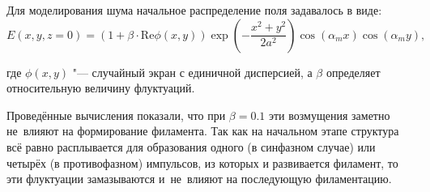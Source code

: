 Для моделирования шума начальное распределение поля задавалось в виде:
\begin{equation}
    E(x, y, z = 0) = (1 + \beta \cdot \mathrm{Re} \phi(x, y)) \exp \left( -\frac{x^2 + y^2}{2 a^2}\right) \cos(\alpha_m x) \cos(\alpha_m y),
\end{equation}

\noindent где $\phi(x, y)$ "--- случайный экран с единичной дисперсией, а $\beta$ определяет относительную величину флуктуаций.

Проведённые вычисления показали, что при $\beta = 0.1$ эти возмущения заметно не~влияют на формирование
филамента. Так как на начальном этапе структура всё равно расплывается для образования одного
(в синфазном случае) или четырёх (в противофазном) импульсов, из которых и развивается филамент,
то эти флуктуации замазываются и~не~влияют на последующую филаментацию. 


\newpage


